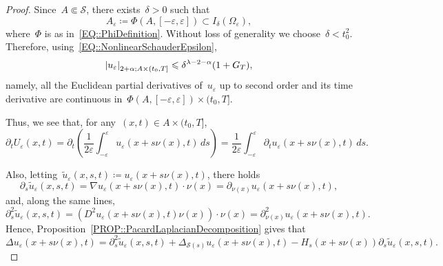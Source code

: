 \documentclass[12pt,a4paper]{amsart}
\makeatletter
\numberwithin{equation}{section}
\theoremstyle{definition}
\theoremstyle{remark}
\newcommand{\eps}{\varepsilon}
\newcommand{\abs}[1]{\left\lvert#1\right\rvert}
\renewcommand{\leq}{\leqslant}
\newcommand{\const}[1]{%
  \csname const@#1\endcsname%
}
\makeatother
\begin{document}
\begin{proof}
    Since~$A \Subset \mathcal{S}$, there exists~$\delta > 0$ such that
    \begin{equation}
        A_\eps \coloneq \Phi(A, [-\eps,\eps]) \subset I_\delta(\Omega_\eps),
    \end{equation}
    where~$\Phi$ is as in~\eqref{EQ::PhiDefinition}. Without loss of generality we choose~$\delta < t_0^2$. Therefore, using~\eqref{EQ::NonlinearSchauderEpsilon},
    \begin{equation}\label{EQ::uepsUniformBound}
        \abs{u_\eps}_{2+\alpha; A \times (t_0,T]} \leq \const{CONST::UniformRegularity} \delta^{\lambda-2-\alpha} (1+G_T),%
    \end{equation}
    namely, all the Euclidean partial derivatives of~$u_\eps$ up to second order and its time derivative are continuous in~$\Phi(A, [-\eps,\eps]) \times (t_0,T]$. %

    Thus, we see that, for any~$(x,t) \in A \times (t_0,T]$, %
    \begin{equation}\label{EQ::partialTuULimit}
        \partial_t U_\eps(x,t) = \partial_t \left(\frac{1}{2\eps}\int_{-\eps}^\eps u_\eps(x+s\nu(x),t)\,ds\right) = \frac{1}{2\eps}\int_{-\eps}^\eps \partial_t u_\eps(x+s\nu(x),t)\,ds.
    \end{equation}

    Also, letting~$\tilde{u}_\eps(x,s,t) \coloneq u_\eps(x+s\nu(x),t)$, there holds
    \[\partial_s \tilde{u}_\eps(x,s,t) = \nabla u_\eps(x+s\nu(x),t) \cdot \nu(x) = \partial_{\nu(x)}u_\eps(x+s\nu(x),t),\]
    and, along the same lines,
    \[\partial_s^2 \tilde{u}_\eps(x,s,t) = \left(D^2 u_\eps(x+s\nu(x),t) \nu(x)\right) \cdot \nu(x) = \partial_{\nu(x)}^2 u_\eps(x+s\nu(x),t).\]
    Hence, Proposition~\ref{PROP::PacardLaplacianDecomposition} gives that
    \begin{equation}\label{EQ::PacardDecompositionuTilde}
        \Delta u_\eps(x+s\nu(x),t) = \partial_s^2 \tilde{u}_\eps(x,s,t) + \Delta_{\mathcal{S}(s)} u_\eps(x+s\nu(x),t) - H_s(x+s\nu(x)) \partial_s \tilde{u}_\eps(x,s,t).
    \end{equation}
    

\end{proof}
\end{document}
